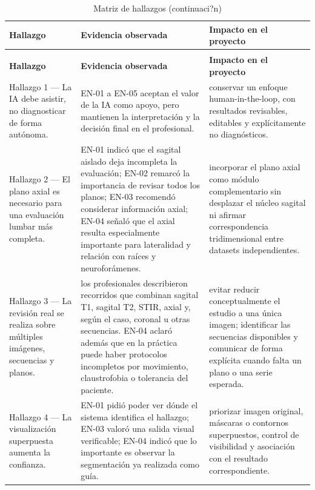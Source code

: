 {\small
\setlength{\LTleft}{0pt}
\setlength{\LTright}{0pt}
\renewcommand{\arraystretch}{1.18}
\begin{longtable}{p{} p{} p{}}
\caption{Matriz de hallazgos}\label{tab:user-research-hallazgos}\\
\hline
\textbf{Hallazgo} & \textbf{Evidencia observada} & \textbf{Impacto en el proyecto} \\
\hline
\endfirsthead
\caption[]{Matriz de hallazgos (continuaci?n)}\\
\hline
\textbf{Hallazgo} & \textbf{Evidencia observada} & \textbf{Impacto en el proyecto} \\
\hline
\endhead
\hline
\endfoot
Hallazgo 1 — La IA debe asistir, no diagnosticar de forma autónoma. & EN-01 a EN-05 aceptan el valor de la IA como apoyo, pero mantienen la interpretación y la decisión final en el profesional. & conservar un enfoque human-in-the-loop, con resultados revisables, editables y explícitamente no diagnósticos. \\
Hallazgo 2 — El plano axial es necesario para una evaluación lumbar más completa. & EN-01 indicó que el sagital aislado deja incompleta la evaluación; EN-02 remarcó la importancia de revisar todos los planos; EN-03 recomendó considerar información axial; EN-04 señaló que el axial resulta especialmente importante para lateralidad y relación con raíces y neuroforámenes. & incorporar el plano axial como módulo complementario sin desplazar el núcleo sagital ni afirmar correspondencia tridimensional entre datasets independientes. \\
Hallazgo 3 — La revisión real se realiza sobre múltiples imágenes, secuencias y planos. & los profesionales describieron recorridos que combinan sagital T1, sagital T2, STIR, axial y, según el caso, coronal u otras secuencias. EN-04 aclaró además que en la práctica puede haber protocolos incompletos por movimiento, claustrofobia o tolerancia del paciente. & evitar reducir conceptualmente el estudio a una única imagen; identificar las secuencias disponibles y comunicar de forma explícita cuando falta un plano o una serie esperada. \\
Hallazgo 4 — La visualización superpuesta aumenta la confianza. & EN-01 pidió poder ver dónde el sistema identifica el hallazgo; EN-03 valoró una salida visual verificable; EN-04 indicó que lo importante es observar la segmentación ya realizada como guía. & priorizar imagen original, máscaras o contornos superpuestos, control de visibilidad y asociación con el resultado correspondiente. \\

\end{longtable}}
